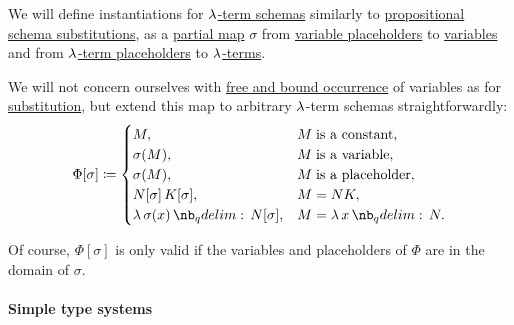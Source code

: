 \begin{definition}\label{def:lambda_term_schema_instantiation}
  We will define instantiations for \hyperref[def:lambda_term_schema]{\( \mathrm{\lambda} \)-term schemas} similarly to \hyperref[def:propositional_schema_instantiation]{propositional schema substitutions}, as a \hyperref[def:set_valued_map/partial]{partial map} \( \sigma \) from \hyperref[def:lambda_term_schema]{variable placeholders} to \hyperref[def:lambda_term]{variables} and from \hyperref[def:lambda_term_schema]{\( \mathrm{\lambda} \)-term placeholders} to \hyperref[def:lambda_term]{\( \mathrm{\lambda} \)-terms}.

  We will not concern ourselves with \hyperref[def:lambda_variable_occurrence]{free and bound occurrence} of variables as for \hyperref[def:lambda_term_schema_substitution]{substitution}, but extend this map to arbitrary \( \mathrm{\lambda} \)-term schemas straightforwardly:
  \begin{equation*}
    \Phi[\sigma] \coloneqq \begin{cases}
      M,                               &M \T{is a constant}, \\
      \sigma(M),                       &M \T{is a variable}, \\
      \sigma(M),                       &M \T{is a placeholder}, \\
      N[\sigma] \thinspace K[\sigma],  &M = NK,              \\
      \qabs {\sigma(x)} N[\sigma],       &M = \qabs x N.       \\
    \end{cases}
  \end{equation*}

  Of course, \( \Phi[\sigma] \) is only valid if the variables and placeholders of \( \Phi \) are in the domain of \( \sigma \).
\end{definition}

\paragraph{Simple type systems}\hfill

